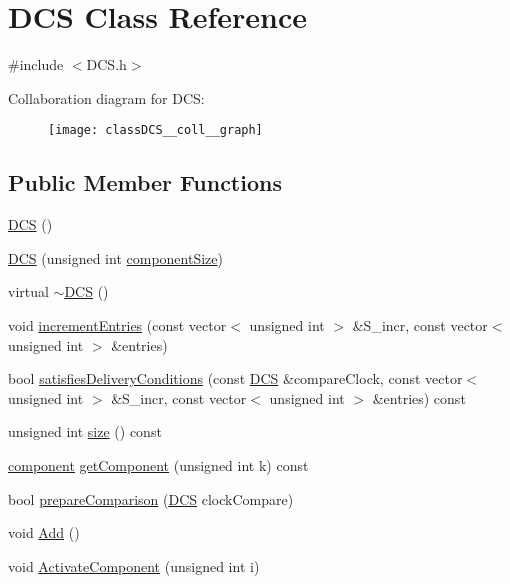 \hypertarget{classDCS}{}\section{D\+CS Class Reference}
\label{classDCS}


{\ttfamily \#include $<$D\+C\+S.\+h$>$}



Collaboration diagram for D\+CS\+:\nopagebreak
\begin{figure}[H]
\begin{center}
\leavevmode
\texttt{[image: classDCS\_\_coll\_\_graph]}
\end{center}
\end{figure}
\subsection*{Public Member Functions}
\begin{DoxyCompactItemize}
\item 
\hyperlink{classDCS_a9b4fbb5c80ef6b265669082703312cd6}{D\+CS} ()
\item 
\hyperlink{classDCS_ad923153aa60c70d718c1be1b47e45a61}{D\+CS} (unsigned int \hyperlink{classDCS_af256dc5d9b30241bfce2e12d57824bec}{component\+Size})
\item 
virtual \hyperlink{classDCS_a7e6e0c1df0b016e246801b4347f3a208}{$\sim$\+D\+CS} ()
\item 
void \hyperlink{classDCS_a7e537421b8edf48c1d00c859c9be53da}{increment\+Entries} (const vector$<$ unsigned int $>$ \&S\+\_\+incr, const vector$<$ unsigned int $>$ \&entries)
\item 
bool \hyperlink{classDCS_aeb765d2361e829ba54620d99e2fb4bf1}{satisfies\+Delivery\+Conditions} (const \hyperlink{classDCS}{D\+CS} \&compare\+Clock, const vector$<$ unsigned int $>$ \&S\+\_\+incr, const vector$<$ unsigned int $>$ \&entries) const
\item 
unsigned int \hyperlink{classDCS_ac428129bbebba59be9a09c09c1096323}{size} () const
\item 
\hyperlink{DCS_8h_aff5561f7728e7d2c203fbfeac4a73866}{component} \hyperlink{classDCS_af1f82450ff5c80deff0fb2d270bf6276}{get\+Component} (unsigned int k) const
\item 
bool \hyperlink{classDCS_a8d66ffc382de5519aa7fb3844b6790af}{prepare\+Comparison} (\hyperlink{classDCS}{D\+CS} clock\+Compare)
\item 
void \hyperlink{classDCS_a8d3778638a4104c2c41569aca7ed17b1}{Add} ()
\item 
void \hyperlink{classDCS_a3c4c817b466389070cb7d8051c2ec38f}{Activate\+Component} (unsigned int i)
\end{DoxyCompactItemize}
